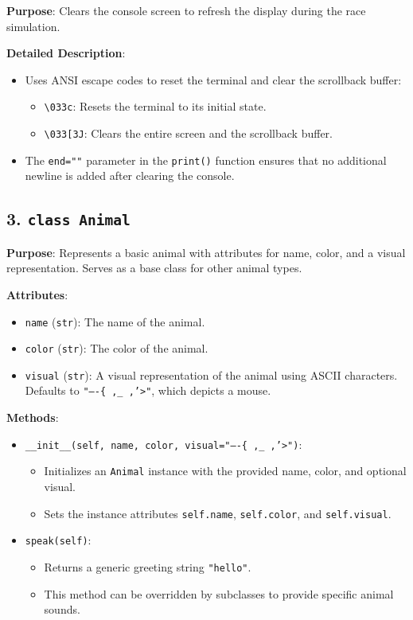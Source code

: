 \begin{homeworkProblem}
\textbf{Purpose}: Clears the console screen to refresh the display during the race simulation.

\textbf{Detailed Description}:

\begin{itemize}
  \item Uses ANSI escape codes to reset the terminal and clear the scrollback buffer:
    \begin{itemize}
      \item \texttt{\textbackslash033c}: Resets the terminal to its initial state.
      \item \texttt{\textbackslash033[3J}: Clears the entire screen and the scrollback buffer.
    \end{itemize}
  \item The \texttt{end=""} parameter in the \texttt{print()} function ensures that no additional newline is added after clearing the console.
\end{itemize}

\bigskip

\subsection*{3. \texttt{class Animal}}

\textbf{Purpose}: Represents a basic animal with attributes for name, color, and a visual representation. Serves as a base class for other animal types.

\textbf{Attributes}:

\begin{itemize}
  \item \texttt{name} (\texttt{str}): The name of the animal.
  \item \texttt{color} (\texttt{str}): The color of the animal.
  \item \texttt{visual} (\texttt{str}): A visual representation of the animal using ASCII characters. Defaults to \texttt{"----\{ ,\_ ,'>"}, which depicts a mouse.
\end{itemize}

\textbf{Methods}:

\begin{itemize}
  \item \texttt{\_\_init\_\_(self, name, color, visual="----\{ ,\_ ,'>")}:
    \begin{itemize}
      \item Initializes an \texttt{Animal} instance with the provided name, color, and optional visual.
      \item Sets the instance attributes \texttt{self.name}, \texttt{self.color}, and \texttt{self.visual}.
    \end{itemize}
  \item \texttt{speak(self)}:
    \begin{itemize}
      \item Returns a generic greeting string \texttt{"hello"}.
      \item This method can be overridden by subclasses to provide specific animal sounds.
    \end{itemize}
\end{itemize}


\end{homeworkProblem}
